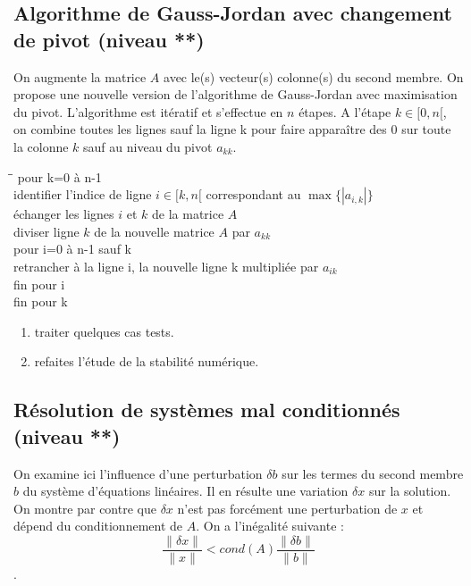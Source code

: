 \documentclass[a4paper, 10pt]{article}
\newcommand{\norm}[1]{\lVert#1\rVert}
\begin{document}
\subsection{Algorithme de Gauss-Jordan avec changement de pivot (niveau **)}

On augmente la matrice $A$ avec le(s) vecteur(s) colonne(s) du second membre.
On propose une nouvelle version de l'algorithme de Gauss-Jordan
avec maximisation du pivot.
L'algorithme est itératif et s'effectue en $n$ étapes. A l'étape $k \in [0, n[$, on
combine toutes les lignes sauf la ligne k pour faire apparaître des $0$ sur toute
la colonne $k$ sauf au niveau du pivot $a_{kk}$.

\begin{tabbing}
\hspace{1cm}\= \hspace{1cm}\= \kill
pour k=0 à n-1 \\
\> identifier l'indice de ligne $i \in [k, n[$  correspondant au $\max \{|a_{i,k}|\}$  \\
\> échanger les lignes $i$ et $k$ de la matrice $A$ \\
\> diviser ligne $k$ de la nouvelle matrice $A$ par $a_{kk}$ \\
\> pour i=0 à n-1 sauf k \\
\> \> retrancher à la ligne i, la nouvelle ligne k multipliée par $a_{ik}$ \\
\> fin pour i \\
fin pour k \\
\end{tabbing}
 
 \begin{enumerate} 
 \item traiter quelques cas tests.
 \item refaites l'étude de la stabilité numérique.
 \end{enumerate}
 
 \subsection{Résolution de systèmes mal conditionnés (niveau **)}
 
 On examine ici l'influence d'une perturbation $\delta b$ sur les termes du second membre $b$
 du  système d'équations linéaires. Il en résulte une variation $\delta x$ sur la solution.
 On montre par contre que $\delta x$ n'est pas forcément une perturbation de $x$ et
 dépend du conditionnement de $A$.
 On a l'inégalité suivante : 
 \begin{equation}
 \frac{\norm {\delta x}}{\norm x} < cond(A) \frac{\norm {\delta b}}{\norm b}
 \label{conderr}
 \end{equation}.
 
\end{document}
